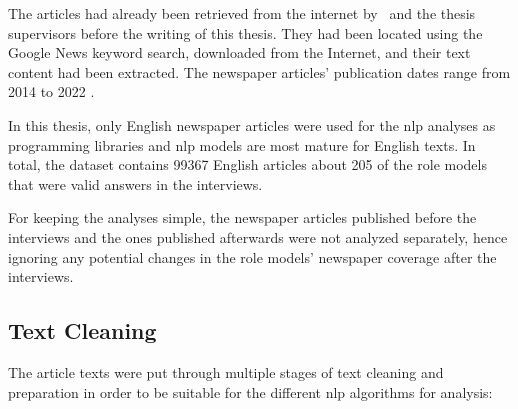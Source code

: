 The articles had already been retrieved from the internet by~\textcite{fenske_using_2022} and the thesis supervisors before the writing of this thesis. They had been located using the Google News keyword search, downloaded from the Internet, and their text content had been extracted. The newspaper articles' publication dates range from 2014 to 2022 \autocite{fenske_using_2022}.

In this thesis, only English newspaper articles were used for the \gls{nlp} analyses as programming libraries and \gls{nlp} models are most mature for English texts. In total, the dataset contains \SI{99367}{} English articles about \SI{205}{} of the role models that were valid answers in the interviews.

For keeping the analyses simple, the newspaper articles published before the interviews and the ones published afterwards were not analyzed separately, hence ignoring any potential changes in the role models' newspaper coverage after the interviews.


\subsection*{Text Cleaning}
The article texts were put through multiple stages of text cleaning and preparation in order to be suitable for the different \gls{nlp} algorithms for analysis:

